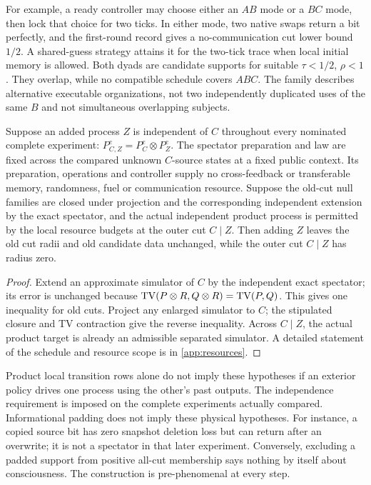 For example, a ready controller may choose either an \(AB\) mode or a \(BC\) mode, then lock that choice for two ticks. In either mode, two native swaps return a bit perfectly, and the first-round record gives a no-communication cut lower bound \(1/2\). A shared-guess strategy attains it for the two-tick trace when local initial memory is allowed. Both dyads are candidate supports for suitable \(\tau<1/2\), \(\rho<1\). They overlap, while no compatible schedule covers \(ABC\). The family describes alternative executable organizations, not two independently duplicated uses of the same \(B\) and not simultaneous overlapping subjects.

\begin{proposition}\label{p2-14}
Suppose an added process \(Z\) is independent of \(C\) throughout every nominated complete experiment: \(P_{C,Z}^{e}=P_C^{e}\otimes P_Z^{e}\). The spectator preparation and law are fixed across the compared unknown \(C\)-source states at a fixed public context. Its preparation, operations and controller supply no cross-feedback or transferable memory, randomness, fuel or communication resource. Suppose the old-cut null families are closed under projection and the corresponding independent extension by the exact spectator, and the actual independent product process is permitted by the local resource budgets at the outer cut \(C\mid Z\). Then adding \(Z\) leaves the old cut radii and old candidate data unchanged, while the outer cut \(C\mid Z\) has radius zero.
\end{proposition}
\begin{proof}
Extend an approximate simulator of \(C\) by the independent exact spectator; its error is unchanged because \(\operatorname{TV}(P\otimes R,Q\otimes R)=\operatorname{TV}(P,Q)\). This gives one inequality for old cuts. Project any enlarged simulator to \(C\); the stipulated closure and TV contraction give the reverse inequality. Across \(C\mid Z\), the actual product target is already an admissible separated simulator. A detailed statement of the schedule and resource scope is in \cref{app:resources}.
\end{proof}
Product local transition rows alone do not imply these hypotheses if an exterior policy drives one process using the other's past outputs. The independence requirement is imposed on the complete experiments actually compared. Informational padding does not imply these physical hypotheses. For instance, a copied source bit has zero snapshot deletion loss but can return after an overwrite; it is not a spectator in that later experiment. Conversely, excluding a padded support from positive all-cut membership says nothing by itself about consciousness. The construction is pre-phenomenal at every step.

